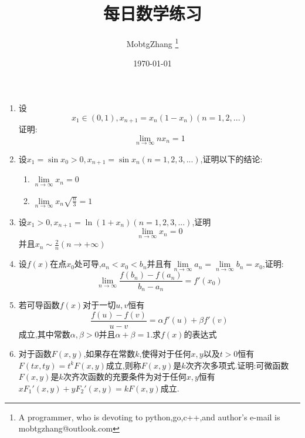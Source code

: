 \documentclass[UTF8,a4paper,10pt]{ctexart}
\title{每日数学练习}
\author{ MobtgZhang \thanks{A programmer, who is devoting to python,go,c++,and author's e-mail is mobtgzhang@outlook.com} }
\date{\today}
\begin{document}
	\maketitle
	\thispagestyle{fancy}
	\begin{flushleft}
		\begin{enumerate}
			\item 设
				\begin{equation}
				x_{1}\in(0,1),x_{n+1}=x_{n}(1-x_{n})(n=1,2,...) \nonumber
				\end{equation}
				证明:
				\begin{equation}
				\lim\limits_{n\rightarrow\infty}nx_{n}=1\nonumber
				\end{equation}
			\item 设$x_{1}=\sin x_{0}>0,x_{n+1}=\sin x_{n}(n=1,2,3,...)$,证明以下的结论:
				\begin{enumerate}
					\item $\lim\limits_{n\rightarrow\infty}x_{n}=0$
					\item $\lim\limits_{n\rightarrow\infty}x_{n}\sqrt{\frac{n}{3}}=1$
				\end{enumerate}
			\item 设$x_{1}>0,x_{n+1}=\ln(1+x_{n})(n=1,2,3,...)$,证明
				\begin{equation}
					\lim\limits_{n\rightarrow\infty}x_{n}=0\nonumber
				\end{equation}
				并且$x_{n}\sim\frac{2}{n}(n\rightarrow+\infty)$
			\item 设$f(x)$在点$x_{0}$处可导,$a_{n}<x_{0}<b_{n}$并且有$\lim\limits_{n\rightarrow\infty}a_{n}=\lim\limits_{n\rightarrow\infty}b_{n}=x_{0}$,证明:
			\begin{equation}
				\lim\limits_{n\rightarrow\infty}\frac{f(b_{n})-f(a_{n})}{b_{n}-a_{n}}=f{'}(x_{0})\nonumber
			\end{equation}
			\item 若可导函数$f(x)$对于一切$u,v$恒有
			\begin{equation}
				\frac{f(u)-f(v)}{u-v}=\alpha f{'}(u)+\beta f{'}(v)\nonumber
			\end{equation}
			成立,其中常数$\alpha,\beta>0$并且$\alpha+\beta=1$.求$f(x)$的表达式
			\item 对于函数$F(x,y)$,如果存在常数$k$,使得对于任何$x,y$以及$t>0$恒有$F(tx,ty)=t^{k}F(x,y)$成立,则称$F(x,y)$是$k$次齐次多项式.证明:可微函数$F(x,y)$是$k$次齐次函数的充要条件为对于任何$x,y$恒有$xF_{1}{'}(x,y)+yF_{2}{'}(x,y)=kF(x,y)$成立.
		\end{enumerate}
	\end{flushleft}
\end{document}
